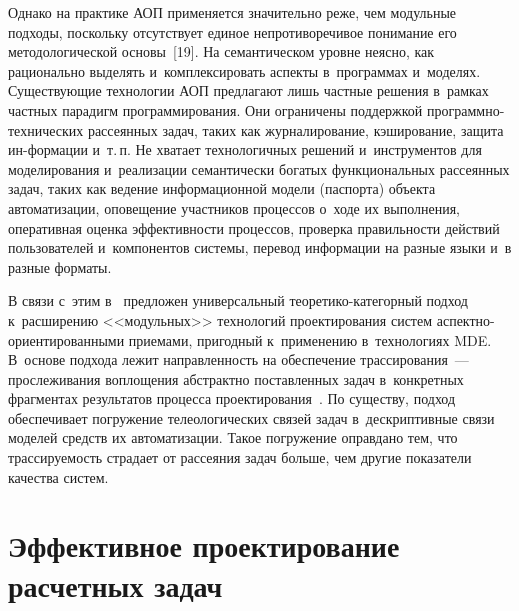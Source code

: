\begin{multicols}{2}
   Однако на практике АОП применяется значительно реже, чем модульные 
подходы, поскольку отсутствует единое непротиворечивое понимание его 
методологической основы~[19]. На семантическом уровне неясно, как 
рационально выделять и~комплексировать аспекты в~программах и~моделях. 
Существующие технологии АОП предлагают лишь частные решения в~рамках 
частных парадигм программирования. Они ограничены поддержкой  
про\-граммно-тех\-ни\-че\-ских рассеянных задач, таких как журналирование, 
кэширование, защита ин-\linebreak формации и~т.\,п. Не хватает технологичных решений %
и~инструментов для моделирования и~реализации семантически богатых 
функциональных рассеянных задач, таких как ведение информационной %
модели (паспорта) объекта автоматизации, опо\-вещение участников процессов 
о~ходе их выполнения, оперативная оценка эффективности процессов, 
проверка правильности действий пользователей и~компонентов системы, 
перевод информации на разные языки и~в разные форматы.
   
   В связи с~этим в~\cite{13-kov, 20-kov} предложен универсальный  
тео\-ре\-ти\-ко-ка\-те\-гор\-ный подход к~расширению <<модульных>> 
технологий проектирования систем ас\-пект\-но-ори\-ен\-ти\-ро\-ван\-ны\-ми 
приемами, пригодный к~применению в~технологиях MDE. В~основе подхода 
лежит направленность на обеспечение трассирования~--- прослеживания 
воплощения абстрактно поставленных задач в~конкретных фрагментах 
результатов процесса проектирования~\cite{21-kov}. По существу, подход 
обеспечивает погружение телеологических связей задач в~дескриптивные связи 
моделей средств их автоматизации. Такое погружение оправдано тем, что 
трассируемость страдает от рассеяния задач больше, чем другие показатели 
качества систем.

\section{Эффективное проектирование расчетных задач}


\end{multicols}
